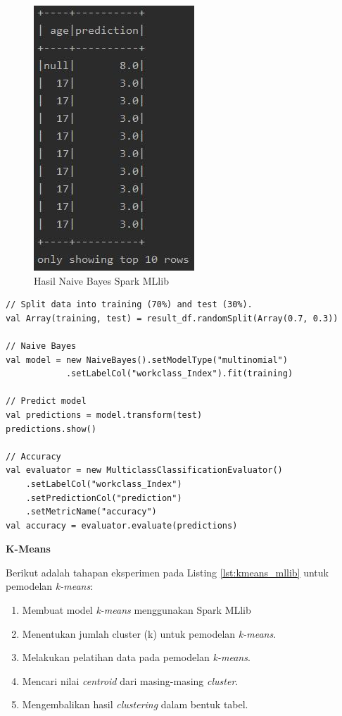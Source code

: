 \documentclass[a4paper,twoside]{article}
\begin{document}
\begin{enumerate}
\begin{figure}[H]
	\centering
	\includegraphics[scale=0.7]{mllib_naivebayes}
	\caption{Hasil Naive Bayes Spark MLlib}
	\label{fig:mllib_naivebayes}
\end{figure}

\begin{lstlisting}[basicstyle=\ttfamily, frame=single,
	columns=fullflexible, keepspaces=true, breaklines=true, label=lst:naivebayes_mllib, caption=Eksperimen Naive Bayes Spark MLlib]
// Split data into training (70%) and test (30%).
val Array(training, test) = result_df.randomSplit(Array(0.7, 0.3))

// Naive Bayes
val model = new NaiveBayes().setModelType("multinomial")
			.setLabelCol("workclass_Index").fit(training)
			
// Predict model
val predictions = model.transform(test)
predictions.show()

// Accuracy
val evaluator = new MulticlassClassificationEvaluator()
	.setLabelCol("workclass_Index")
	.setPredictionCol("prediction")
	.setMetricName("accuracy")
val accuracy = evaluator.evaluate(predictions)

\end{lstlisting}

\newpage
\textbf{K-Means}

\noindent Berikut adalah tahapan eksperimen pada Listing \ref{lst:kmeans_mllib} untuk pemodelan \textit{k-means}:
\begin{enumerate}
\item Membuat model \textit{k-means} menggunakan Spark MLlib
\item Menentukan jumlah cluster (k) untuk pemodelan \textit{k-means}.
\item Melakukan pelatihan data pada pemodelan \textit{k-means}.
\item Mencari nilai \textit{centroid} dari masing-masing \textit{cluster}.
\item Mengembalikan hasil \textit{clustering} dalam bentuk tabel.


\end{enumerate}
\end{enumerate}
\end{document}
